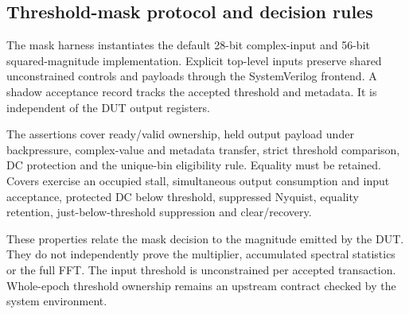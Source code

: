 \subsection{Threshold-mask protocol and decision rules}
The mask harness instantiates the default 28-bit complex-input and 56-bit squared-magnitude implementation. Explicit top-level inputs preserve shared unconstrained controls and payloads through the SystemVerilog frontend. A shadow acceptance record tracks the accepted threshold and metadata. It is independent of the DUT output registers.

The assertions cover ready/valid ownership, held output payload under backpressure, complex-value and metadata transfer, strict threshold comparison, DC protection and the unique-bin eligibility rule. Equality must be retained. Covers exercise an occupied stall, simultaneous output consumption and input acceptance, protected DC below threshold, suppressed Nyquist, equality retention, just-below-threshold suppression and clear/recovery.

These properties relate the mask decision to the magnitude emitted by the DUT. They do not independently prove the multiplier, accumulated spectral statistics or the full FFT. The input threshold is unconstrained per accepted transaction. Whole-epoch threshold ownership remains an upstream contract checked by the system environment.
